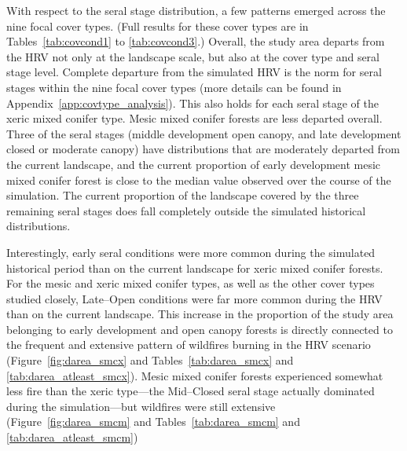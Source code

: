 With respect to the seral stage distribution, a few patterns emerged across the nine focal cover types. (Full results for these cover types are in Tables~\ref{tab:covcond1} to \ref{tab:covcond3}.) Overall, the study area departs from the HRV not only at the landscape scale, but also at the cover type and seral stage level. Complete departure from the simulated HRV is the norm for seral stages within the nine focal cover types (more details can be found in Appendix~\ref{app:covtype_analysis}). This also holds for each seral stage of the xeric mixed conifer type. Mesic mixed conifer forests are less departed overall. Three of the seral stages (middle development open canopy, and late development closed or moderate canopy) have distributions that are moderately departed from the current landscape, and the current proportion of early development mesic mixed conifer forest is close to the median value observed over the course of the simulation. The current proportion of the landscape covered by the three remaining seral stages does fall completely outside the simulated historical distributions.

Interestingly, early seral conditions were more common during the simulated historical period than on the current landscape for xeric mixed conifer forests. For the mesic and xeric mixed conifer types, as well as the other cover types studied closely, Late--Open conditions were far more common during the HRV than on the current landscape. This increase in the proportion of the study area belonging to early development and open canopy forests is directly connected to the frequent and extensive pattern of wildfires burning in the HRV scenario (Figure~\ref{fig:darea_smcx} and Tables~\ref{tab:darea_smcx} and \ref{tab:darea_atleast_smcx}). Mesic mixed conifer forests experienced somewhat less fire than the xeric type---the Mid--Closed seral stage actually dominated during the simulation---but wildfires were still extensive (Figure~\ref{fig:darea_smcm} and Tables~\ref{tab:darea_smcm} and \ref{tab:darea_atleast_smcm})




